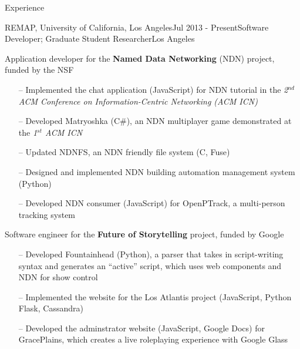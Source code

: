 \documentclass{resume} %
\begin{document}
\begin{rSection}{Experience}

\begin{rSubsection}{REMAP, University of California, Los Angeles}{Jul 2013 - Present}{Software Developer; Graduate Student Researcher}{Los Angeles}
\item Application developer for the \textbf{Named Data Networking} (NDN) project, funded by the NSF

\begin{itemize}[noitemsep,topsep=-6pt]
\item[--] Implemented the chat application (JavaScript) for NDN tutorial in the \textit{2$^{nd}$ ACM Conference on Information-Centric Networking (ACM ICN)}
\item[--] Developed Matryoshka (C\#), an NDN multiplayer game demonstrated at the \textit{1$^{st}$ ACM ICN}
\item[--] Updated NDNFS, an NDN friendly file system (C, Fuse)
\item[--] Designed and implemented NDN building automation management system (Python)
\item[--] Developed NDN consumer (JavaScript) for OpenPTrack, a multi-person tracking system
\end{itemize}

\item Software engineer for the \textbf{Future of Storytelling} project, funded by Google

\begin{itemize}[noitemsep,topsep=-6pt]
\item[--] Developed Fountainhead (Python), a parser that takes in script-writing syntax and generates an ``active'' script, which uses web components and NDN for show control
\item[--] Implemented the website for the Los Atlantis project (JavaScript, Python Flask, Cassandra)
\item[--] Developed the adminstrator website (JavaScript, Google Docs) for GracePlains, which creates a live roleplaying experience with Google Glass
\end{itemize}

\end{rSubsection}

\end{rSection}

\end{document}
